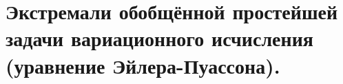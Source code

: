 \section{Экстремали обобщённой простейшей задачи вариационного исчисления (уравнение Эйлера-Пуассона).}